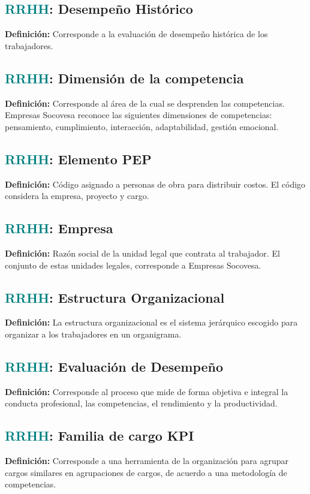 \documentclass[12pt]{article}
\begin{document}
\subsection{\textcolor{teal}{RRHH}: Desempeño Histórico}
\textbf{Definición:} Corresponde a la evaluación de desempeño histórica de los trabajadores.
\subsection{\textcolor{teal}{RRHH}: Dimensión de la competencia}
\textbf{Definición:} Corresponde al área de la cual se desprenden las competencias. Empresas Socovesa reconoce las siguientes dimensiones de competencias: pensamiento, cumplimiento, interacción, adaptabilidad, gestión emocional.

\subsection{\textcolor{teal}{RRHH}: Elemento PEP}
\textbf{Definición:} Código asignado a personas de obra para distribuir costos. El código considera la empresa, proyecto y cargo.
\subsection{\textcolor{teal}{RRHH}: Empresa}
\textbf{Definición:} Razón social de la unidad legal que contrata al trabajador. El conjunto de estas unidades legales, corresponde a Empresas Socovesa.
\subsection{\textcolor{teal}{RRHH}: Estructura Organizacional}
\textbf{Definición:} La estructura organizacional es el sistema jerárquico escogido para organizar a los trabajadores en un organigrama.
\subsection{\textcolor{teal}{RRHH}: Evaluación de Desempeño}
\textbf{Definición:} Corresponde al proceso que mide de forma objetiva e integral la conducta profesional, las competencias, el rendimiento y la productividad. 
\subsection{\textcolor{teal}{RRHH}: Familia de cargo KPI}
\textbf{Definición:} Corresponde a una herramienta de la organización para agrupar cargos similares en agrupaciones de cargos, de acuerdo a una metodología de competencias.
\end{document}

